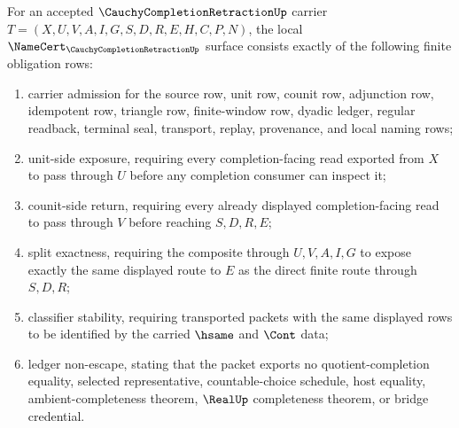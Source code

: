 \begin{theorem}
\label{thm:cauchy-completion-retraction-namecert-obligations}
For an accepted $\CauchyCompletionRetractionUp$ carrier $T=(X,U,V,A,I,G,S,D,R,E,H,C,P,N)$, the local $\NameCert_{\CauchyCompletionRetractionUp}$ surface consists exactly of the following finite obligation rows:
\begin{enumerate}
\item carrier admission for the source row, unit row, counit row, adjunction row, idempotent row, triangle row, finite-window row, dyadic ledger, regular readback, terminal seal, transport, replay, provenance, and local naming rows;
\item unit-side exposure, requiring every completion-facing read exported from $X$ to pass through $U$ before any completion consumer can inspect it;
\item counit-side return, requiring every already displayed completion-facing read to pass through $V$ before reaching $S,D,R,E$;
\item split exactness, requiring the composite through $U,V,A,I,G$ to expose exactly the same displayed route to $E$ as the direct finite route through $S,D,R$;
\item classifier stability, requiring transported packets with the same displayed rows to be identified by the carried $\hsame$ and $\Cont$ data;
\item ledger non-escape, stating that the packet exports no quotient-completion equality, selected representative, countable-choice schedule, host equality, ambient-completeness theorem, $\RealUp$ completeness theorem, or bridge credential.
\end{enumerate}
\end{theorem}
